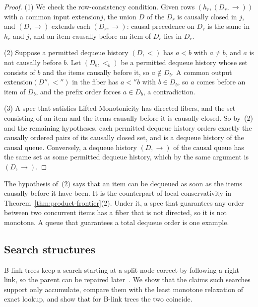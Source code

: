 \documentclass[sigconf]{cidr-2027}
\theoremstyle{remark}
\newcommand{\indesc}{input extension\xspace} %
\newcommand{\outrel}{extends\xspace}          %
\newcommand{\outnoun}{output extension\xspace}%
\begin{document}
\begin{proof}
(1) We check the row-consistency condition. Given rows $(h_r,(D_r,\to))$
with a common \indesc $j$, the union $D$ of the $D_r$ is causally closed in
$j$, and $(D,\to)$ \outrel each $(D_r,\to)$: causal precedence on $D_r$ is the
same in $h_r$ and $j$, and an item causally before an item of $D_r$ lies in
$D_r$.

(2) Suppose a permitted dequeue history $(D,<)$ has $a<b$ with $a\neq b$, and
$a$ is not causally before $b$. Let $(D_b,<_b)$ be a permitted dequeue history
whose set consists of $b$ and the items causally before it, so
$a\notin D_b$. A common \outnoun $(D'',<'')$ in the fiber has $a<''b$ with
$b\in D_b$, so $a$ comes before an item of $D_b$, and the prefix order forces
$a\in D_b$, a contradiction.

(3) A spec that satisfies Lifted Monotonicity has directed fibers, and the set
consisting of an item and the items causally before it is causally closed. So by~(2) and the remaining hypotheses, each permitted dequeue history orders
exactly the causally ordered pairs of its causally closed set, and is a dequeue
history of the causal queue. Conversely, a dequeue history $(D,\to)$ of the
causal queue has the same set as some permitted dequeue history, which by the
same argument is $(D,\to)$.
\end{proof}

The hypothesis of~(2) says that an item can be dequeued as soon as the items
causally before it have been. It is the counterpart of local conservativity
in Theorem~\ref{thm:product-frontier}(2). Under it, a spec that guarantees any
order between two concurrent items has a fiber that is not directed, so it is
not monotone. A queue that guarantees a total dequeue order is one example.

\subsection{Search structures}
\label{app:search}

B-link trees keep a search starting at a split node correct by following a
right link, so the parent can be repaired later~\cite{lehman1981efficient}. We
show that the claims such searches support only accumulate, compare them with
the least monotone relaxation of exact lookup, and show that for B-link trees
the two coincide.
\end{document}
